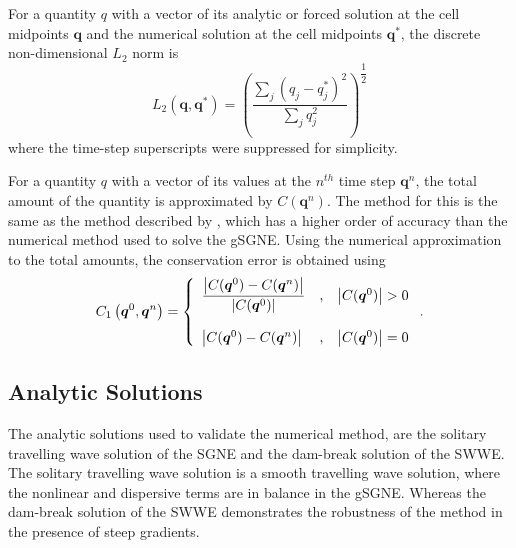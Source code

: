 \documentclass[10pt]{elsarticle}
\newcommand{\vecn}[1]{\boldsymbol{#1}}
\begin{document}
For a quantity $q$ with a vector of its analytic or forced solution at the cell midpoints $\vecn{q}$ and the numerical solution at the cell midpoints $\vecn{q}^*$, the discrete non-dimensional $L_2$ norm is
\begin{equation}
\label{eqn:Conv_Error}
L_2\left(\vecn{q},\vecn{q}^*\right) = \left( \dfrac{\displaystyle\sum_{j}^{}  \left(q_j - q^*_j\right)^2}{\displaystyle\sum_{j}^{}  q_j^2 } \right)^{\dfrac{1}{2}}
\end{equation}
where the time-step superscripts were suppressed for simplicity.

For a quantity $q$ with a vector of its values at the $n^{th}$ time step $\vecn{q}^n$, the total amount of the quantity is approximated by $C(\vecn{q}^n)$. The method for this is the same as the method described by \citet{Zoppou-etal-2017}, which has a higher order of accuracy than the numerical method used to solve the gSGNE. Using the numerical approximation to the total amounts, the conservation error is obtained using
\begin{equation}
\label{eqn:Cons_Error}
C_1\left(\vecn{q}^0,\vecn{q}^n\right) = \left \lbrace \begin{array}{l c r}
\dfrac{\left | C(\vecn{q}^0) - C(\vecn{q}^n) \right |}{\left| C(\vecn{q}^0) \right|} &,& \left| C(\vecn{q}^0) \right| > 0 \\ \\
\left | C(\vecn{q}^0) - C(\vecn{q}^n) \right |&,& \left| C(\vecn{q}^0) \right| = 0 
\end{array} \right. .
\end{equation}


\subsection{Analytic Solutions}
\label{sec:AnaSol}
The analytic solutions used to validate the numerical method, are the solitary travelling wave solution of the SGNE and the dam-break solution of the SWWE. The solitary travelling wave solution is a smooth travelling wave solution, where the nonlinear and dispersive terms are in balance in the gSGNE. Whereas the dam-break solution of the SWWE demonstrates the robustness of the method in the presence of steep gradients. 
\end{document}
